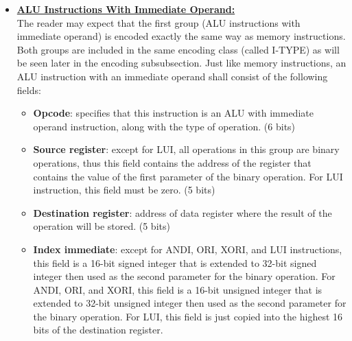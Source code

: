 \documentclass[oneside]{book}
\begin{document}
\begin{itemize}
\item

\textbf{\underline{ALU Instructions With Immediate Operand:}} \\

The reader may expect that the first group (ALU instructions
with immediate operand) is encoded exactly the same way as
memory instructions. Both groups are included in the same
encoding class (called I-TYPE) as will be seen later in
the encoding subsubsection. Just like memory instructions,
an ALU instruction with an immediate operand shall consist
of the following fields:

\begin{itemize}

\item \textbf{Opcode}: specifies that this instruction is an ALU
                       with immediate operand instruction, along
                       with the type of operation. (6 bits)

\item \textbf{Source register}: except for LUI, all operations in
                                this group are binary operations, thus
                                this field contains the address of the
                                register that contains the value of
                                the first parameter of the binary
                                operation. For LUI instruction, this
                                field must be zero. (5 bits)

\item \textbf{Destination register}: address of data register where
                                     the result of the operation will
                                     be stored. (5 bits)

\item \textbf{Index immediate}: except for ANDI, ORI, XORI, and LUI
                                instructions, this field is a 16-bit signed
                                integer that is extended to 32-bit signed
                                integer then used as the second parameter
                                for the binary operation. For ANDI, ORI,
                                and XORI, this field is a 16-bit unsigned
                                integer that is extended to 32-bit unsigned
                                integer then used as the second parameter
                                for the binary operation. For LUI, this
                                field is just copied into the highest 16 bits
                                of the destination register.


\end{itemize}
\end{itemize}
\end{document}
